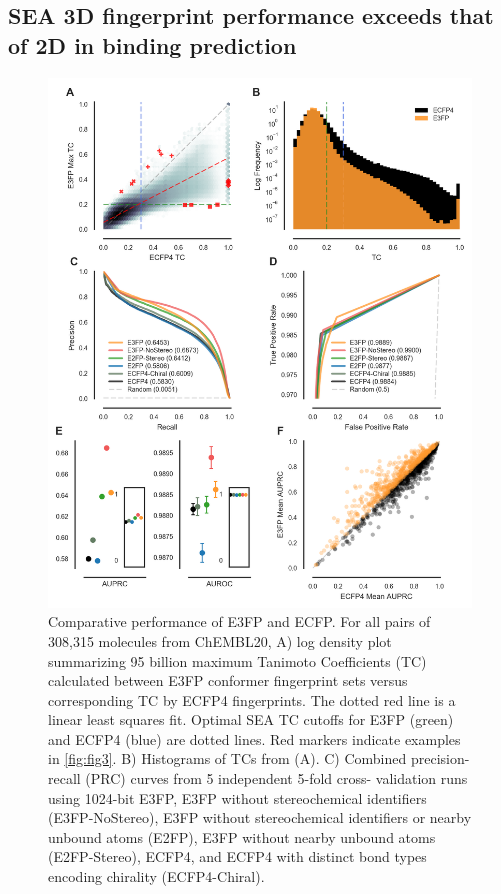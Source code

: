 \documentclass[../main.tex]{subfiles}
\begin{document}
\begin{refsection}
\subsection*{SEA 3D fingerprint performance exceeds that of 2D in binding prediction}

\begin{figure}%
    \centering  \includegraphics[width=13.5cm]{figures/chapter2/fig2.png}
    \caption[Comparative performance of E3FP and ECFP]{
        Comparative performance of E3FP and ECFP.
        For all pairs of 308,315 molecules from ChEMBL20, A) log density plot summarizing 95 billion maximum Tanimoto Coefficients (TC) calculated between E3FP conformer fingerprint sets versus corresponding TC by ECFP4 fingerprints.
        The dotted red line is a linear least squares fit.
        Optimal SEA TC cutoffs for E3FP  (green) and ECFP4 (blue) are dotted lines.
        Red markers indicate examples in \cref{fig:fig3}.
        B) Histograms of TCs from (A).
        C) Combined precision-recall (PRC) curves from 5 independent 5-fold cross- validation runs using 1024-bit E3FP, E3FP without stereochemical identifiers (E3FP-NoStereo), E3FP without stereochemical identifiers or nearby unbound atoms  (E2FP), E3FP without nearby unbound atoms (E2FP-Stereo), ECFP4, and ECFP4 with distinct bond types encoding chirality  (ECFP4-Chiral).
}
\end{figure}
\end{refsection}
\end{document}
